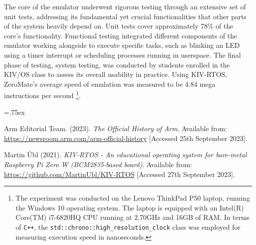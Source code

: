 \documentclass{template_svk}
\begin{document}
The core of the emulator underwent rigorous testing through an extensive set of unit tests, addressing its fundamental yet crucial functionalities that other parts of the system heavily depend on. Unit tests cover approximately 78\% of the core’s functionality. Functional testing integrated different components of the emulator working alongside to execute specific tasks, such as blinking an LED using a timer interrupt or scheduling processes running in userspace. The final phase of testing, system testing, was conducted by students enrolled in the KIV/OS class to assess its overall usability in practice. Using KIV-RTOS, ZeroMate’s average speed of emulation was measured to be 4.84 mega instructions per second \footnote{The experiment was conducted on the Lenovo ThinkPad P50 laptop, running the Windows 10 operating system. The laptop is equipped with an Intel(R) Core(TM) i7-6820HQ CPU running at 2.70GHz and 16GB of RAM. In terms of \texttt{C++}, the \texttt{std::chrono::high\_resolution\_clock} class was employed for measuring execution speed in nanoseconds.}.

\begin{thebibliography}{99}\itemsep=.75ex%
	
	Arm Editorial Team. (2023). \textit{The Official History of Arm}.
	Available from: \url{https://newsroom.arm.com/arm-official-history}
	[Accessed 25th September 2023].
	
	Martin Úbl (2021). \textit{KIV-RTOS - An educational operating system for bare-metal Raspberry Pi Zero W (BCM2835-based board)}. Available from: \url{https://github.com/MartinUbl/KIV-RTOS} [Accessed 27th September 2023].

	
\end{thebibliography}
\end{document}
